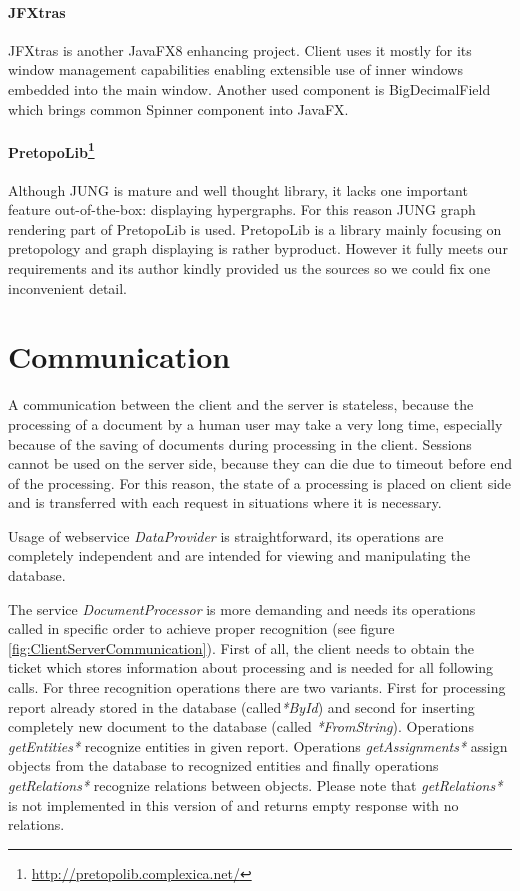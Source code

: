 \paragraph{JFXtras}
JFXtras is another JavaFX8 enhancing project. \textan{} Client uses it mostly
for its window management capabilities enabling extensible use of inner windows
embedded into the main window. Another used component is BigDecimalField which
brings common Spinner component into JavaFX.


\paragraph{PretopoLib\footnote{\url{http://pretopolib.complexica.net/}}}
Although JUNG is mature and well thought library, it lacks one important feature
out-of-the-box: displaying hypergraphs. For this reason JUNG graph rendering
part of PretopoLib is used. PretopoLib is a library mainly focusing on
pretopology and graph displaying is rather byproduct. However it fully meets our
requirements and its author kindly provided us the sources so we could fix one
inconvenient detail.

\section{Communication}
\label{sec:Communication}

A communication between the client and the server is stateless, because the processing
of a document by a human user may take a very long time, especially because of the saving
of documents during processing in the client. Sessions cannot be used on
the server side, because they can die due to timeout before end of the processing.
For this reason, the state of a processing is placed on client side and is transferred
with each request in situations where it is necessary.

Usage of webservice \emph{DataProvider} is straightforward, its operations are
completely independent and are intended for viewing and manipulating
the database.

The service \emph{DocumentProcessor} is more demanding and needs its operations
called in specific order to achieve proper recognition (see figure
\ref{fig:ClientServerCommunication}). First of all, the client needs to obtain
the ticket which stores information about processing and is needed for all
following calls. For three recognition operations there are two variants. First
for processing report already stored in the database (called\emph{*ById}) and
second for inserting completely new document to the database (called
\emph{*FromString}). Operations \emph{getEntities*} recognize entities in
given report. Operations \emph{getAssignments*} assign objects from the database
to recognized entities and finally operations \emph{getRelations*} recognize
relations between objects. Please note that \emph{getRelations*} is not
implemented in this version of \textan{} and returns empty response with no
relations.

